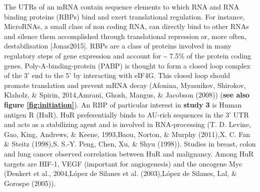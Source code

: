 \documentclass[12pt,openany]{book}
\begin{document}
The UTRs of an mRNA contain sequence elements to which RNA and RNA
binding proteins (RBPs) bind and exert translational regulation. For
instance, MicroRNAs, a small class of non coding RNA, can directly bind
to other RNAs and silence them accomplished through translational
repression or, more often, destabilisation {[}Jonas2015{]}. RBPs are a
class of proteins involved in many regulatory steps of gene expression
and account for \textasciitilde{} 7.5\% of the protein coding genes.
Poly-A-binding-protein (PABP) is thought to form a closed loop complex
of the 3' end to the 5' by interacting with eIF4G. This closed loop
should promote translation and prevent mRNA decay (Afonina, Myasnikov,
Shirokov, Klaholz, \& Spirin, 2014,Amrani, Ghosh, Mangus, \& Jacobson
(2008)) (\textbf{see also figure \ref{fig:initiation}}). An RBP of
particular interest in \textbf{study 3} is Human antigen R (HuR). HuR
preferentially binds to AU-rich sequences in the 3' UTR and acts as a
stabilizing agent and is involved in RNA-processing (T. D. Levine, Gao,
King, Andrews, \& Keene, 1993,Baou, Norton, \& Murphy (2011),X. C. Fan
\& Steitz (1998),S. S.-Y. Peng, Chen, Xu, \& Shyu (1998)). Studies in
breast, colon and lung cancer observed correlation between HuR and
malignancy. Among HuR targets are HIF-1, VEGF (important for
angiogenesis) and the oncogene Myc (Denkert et al., 2004,López de
Silanes et al. (2003),López de Silanes, Lal, \& Gorospe (2005)).
\end{document}
